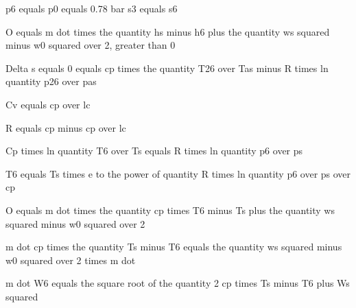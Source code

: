 p6 equals p0 equals 0.78 bar  
s3 equals s6  

O equals m dot times the quantity hs minus h6 plus the quantity ws squared minus w0 squared over 2, greater than 0  

Delta s equals 0 equals cp times the quantity T26 over Tas minus R times ln quantity p26 over pas  

Cv equals cp over lc  

R equals cp minus cp over lc  

Cp times ln quantity T6 over Ts equals R times ln quantity p6 over ps  

T6 equals Ts times e to the power of quantity R times ln quantity p6 over ps over cp  

O equals m dot times the quantity cp times T6 minus Ts plus the quantity ws squared minus w0 squared over 2  

m dot cp times the quantity Ts minus T6 equals the quantity ws squared minus w0 squared over 2 times m dot  

m dot W6 equals the square root of the quantity 2 cp times Ts minus T6 plus Ws squared
